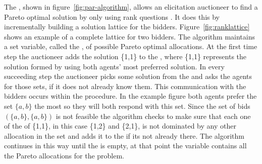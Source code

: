 The , shown in figure~\ref{fig:par-algorithm},
allows an elicitation auctioneer to find a Pareto optimal solution by
only using rank questions \cite{conen02a}.  It does this by
incrementally building a solution lattice for the bidders.
Figure~\ref{fig:ranklattice} shows an example of a complete lattice
for two bidders. The  algorithm maintains a set variable,
called the , of possible Pareto optimal allocations. At the
first time step the auctioneer adds the solution \{1,1\} to the
, where \{1,1\} represents the solution formed by using
both agents' most preferred solution.  In every succeeding step the
auctioneer picks some solution from the  and asks the
agents for those sets, if it does not already know them. This
communication with the bidders occurs within the 
procedure. In the example figure both agents prefer the set $\{a,b\}$
the most so they will both respond with this set. Since the set of
bids $(\{a,b\}, \{a,b\})$ is not feasible the algorithm checks to make
sure that each one of the  of \{1,1\}, in this case
\{1,2\} and \{2,1\}, is not dominated by any other allocation in the
set  and adds it to the  if its not
already there. The algorithm continues in this way until the
 is empty, at that point the variable 
contains all the Pareto allocations for the problem.

